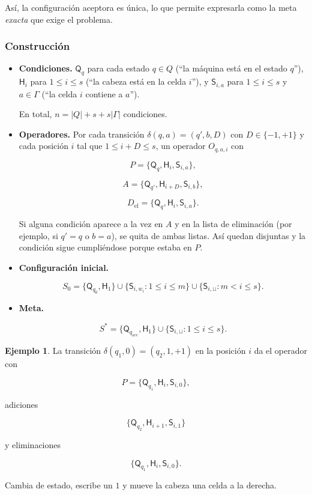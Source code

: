 \documentclass[11pt,letterpaper]{article}
\theoremstyle{plain}
\theoremstyle{definition}
\newtheorem{ejemplo}[teorema]{Ejemplo}
\theoremstyle{remark}
\newcommand{\cond}[1]{\mathsf{#1}}
\begin{document}
Así, la configuración aceptora es única,
lo que permite expresarla como la meta
\emph{exacta} que exige el problema.

\subsubsection{Construcción}

\begin{itemize}[leftmargin=1.5em,itemsep=2pt]

\item \textbf{Condiciones.}
$\cond{Q}_q$ para cada estado $q\in Q$
(``la máquina está en el estado $q$''),
$\cond{H}_i$ para $1\le i\le s$
(``la cabeza está en la celda $i$''),
y $\cond{S}_{i,a}$ para $1\le i\le s$
y $a\in\Gamma$
(``la celda $i$ contiene a $a$'').

En total,
$n=|Q|+s+s|\Gamma|$ condiciones.

\item \textbf{Operadores.}
Por cada transición
$\delta(q,a)=(q',b,D)$
con $D\in\{-1,+1\}$ y cada posición
$i$ tal que $1\le i+D\le s$,
un operador $O_{q,a,i}$ con

\[
P=\{\cond{Q}_q,\cond{H}_i,\cond{S}_{i,a}\},
\]

\[
A=\{\cond{Q}_{q'},\cond{H}_{i+D},\cond{S}_{i,b}\},
\]

\[
D_{\mathrm{el}}=
\{\cond{Q}_q,\cond{H}_i,\cond{S}_{i,a}\}.
\]

Si alguna condición aparece a la vez en $A$
y en la lista de eliminación
(por ejemplo, si $q'=q$ o $b=a$),
se quita de ambas listas. Así quedan
disjuntas y la condición sigue cumpliéndose
porque estaba en $P$.

\item \textbf{Configuración inicial.}

\[
S_0=
\{\cond{Q}_{q_0},\cond{H}_1\}
\cup
\{\cond{S}_{i,w_i}:1\le i\le m\}
\cup
\{\cond{S}_{i,\sqcup}:m<i\le s\}.
\]

\item \textbf{Meta.}

\[
S^{*}=
\{\cond{Q}_{q_{\mathrm{acc}}},\cond{H}_1\}
\cup
\{\cond{S}_{i,\sqcup}:1\le i\le s\}.
\]

\end{itemize}

\begin{ejemplo}
La transición
$\delta(q_1,0)=(q_2,1,+1)$
en la posición $i$ da el operador con

\[
P=\{\cond{Q}_{q_1},\cond{H}_i,\cond{S}_{i,0}\},
\]

adiciones

\[
\{\cond{Q}_{q_2},\cond{H}_{i+1},\cond{S}_{i,1}\}
\]

y eliminaciones

\[
\{\cond{Q}_{q_1},\cond{H}_i,\cond{S}_{i,0}\}.
\]

Cambia de estado, escribe un $1$ y mueve
la cabeza una celda a la derecha.
\end{ejemplo}
\end{document}
